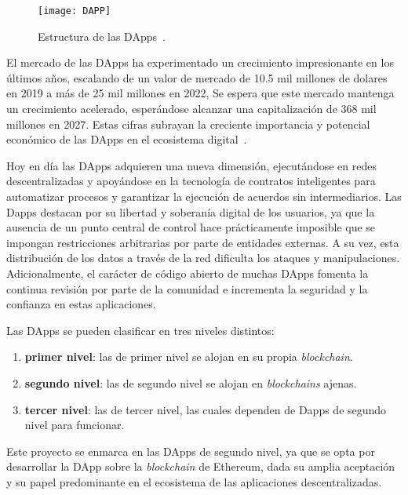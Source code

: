 \begin{figure}[h]
	\centering
	\texttt{[image: DAPP]}
	\caption[Estructura de las DApps]{Estructura de las DApps~\cite{dAppDiagrama}.}
	\label{fig:DAPP}
\end{figure}

El mercado de las DApps ha experimentado un crecimiento impresionante en los últimos años, escalando de un valor de mercado de 10.5 mil millones de dolares en 2019 a más de 25 mil millones en 2022, Se espera que este mercado mantenga un crecimiento acelerado, esperándose alcanzar una capitalización de 368 mil millones en 2027. Estas cifras subrayan la creciente importancia y potencial económico de las DApps en el ecosistema digital~\cite{DAppsEconomía}.

Hoy en día las DApps adquieren una nueva dimensión, ejecutándose en redes descentralizadas y apoyándose en la tecnología de contratos inteligentes para automatizar procesos y garantizar la ejecución de acuerdos sin intermediarios.
Las Dapps destacan por su libertad y soberanía digital de los usuarios, ya que la ausencia de un punto central de control hace prácticamente imposible que se impongan restricciones arbitrarias por parte de entidades externas. A su vez, esta distribución de los datos a través de la red dificulta los ataques y manipulaciones.
Adicionalmente, el carácter de código abierto de muchas DApps fomenta la continua revisión por parte de la comunidad e incrementa la seguridad y la confianza en estas aplicaciones.

Las DApps se pueden clasificar en tres niveles distintos: 

\begin{enumerate}
\item \textbf{primer nivel}: las de primer nivel se alojan en su propia \textit{blockchain}.

\item \textbf{segundo nivel}: las de segundo nivel se alojan en \textit{blockchains} ajenas.

\item \textbf{tercer nivel}: las de tercer nivel, las cuales dependen de Dapps de segundo nivel para funcionar.
\end{enumerate}

Este proyecto se enmarca en las DApps de segundo nivel, ya que se opta por desarrollar la DApp sobre la \textit{blockchain} de Ethereum, dada su amplia aceptación y su papel predominante en el ecosistema de las aplicaciones descentralizadas.


